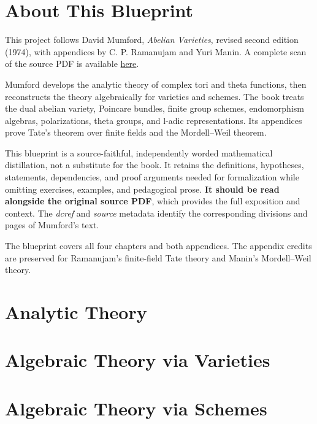 

\chapter*{About This Blueprint}
\label{mumford-about}

This project follows David Mumford, \emph{Abelian Varieties}, revised second
edition (1974), with appendices by C. P. Ramanujam and Yuri Manin. A complete
scan of the source PDF is available
\href{https://wstein.org/edu/Fall2003/252/references/mumford-abvar/Mumford-Abelian_Varieties.pdf}{here}.

Mumford develops the analytic theory of complex tori and theta functions,
then reconstructs the theory algebraically for varieties and schemes. The
book treats the dual abelian variety, Poincare bundles, finite group schemes,
endomorphism algebras, polarizations, theta groups, and l-adic
representations. Its appendices prove Tate's theorem over finite fields and
the Mordell--Weil theorem.

This blueprint is a source-faithful, independently worded mathematical
distillation, not a substitute for the book. It retains the definitions,
hypotheses, statements, dependencies, and proof arguments needed for
formalization while omitting exercises, examples, and pedagogical prose.
\textbf{It should be read alongside the original source PDF}, which provides
the full exposition and context. The \emph{dcref} and \emph{source} metadata
identify the corresponding divisions and pages of Mumford's text.

The blueprint covers all four chapters and both appendices. The appendix
credits are preserved for Ramanujam's finite-field Tate theory and Manin's
Mordell--Weil theory.

\chapter{Analytic Theory}
\label{chap:mumford-analytic}


\chapter{Algebraic Theory via Varieties}
\label{chap:mumford-varieties}


\chapter{Algebraic Theory via Schemes}
\label{chap:mumford-schemes}


